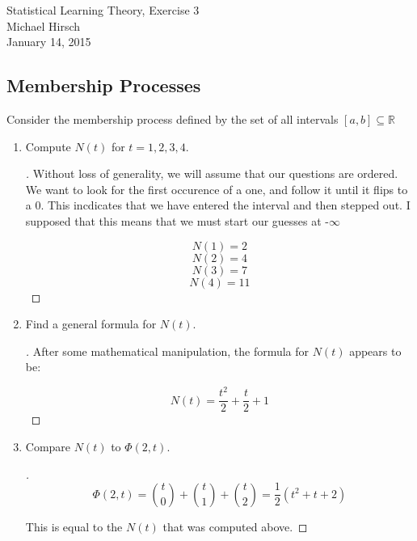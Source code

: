 \documentclass[]{book}
\theoremstyle{definition}
\begin{document}
\begin{center}
{\Large Statistical Learning Theory, Exercise 3}\\
Michael Hirsch\\ %
January 14, 2015 %
\end{center}

\vspace{0.2 cm}


\subsection*{Membership Processes}

Consider the membership process defined by the set of all intervals $[a, b] \subseteq \mathbb{R}$


\begin{enumerate}
\item\label{norms}

Compute $N(t)$ for $t = 1, 2, 3, 4$.

\begin{proof}[\unskip\nopunct]

Without loss of generality, we will assume that our questions are ordered. We want to look for the first occurence of a one, and follow it until it flips to a 0. This incdicates that we have entered the interval and then stepped out. I supposed that this means that we must start our guesses at -$\infty$

$$N(1) = 2$$
$$N(2) = 4$$
$$N(3) = 7$$
$$N(4) = 11$$



\end{proof}

\item

Find a general formula for $N(t)$.

\begin{proof}[\unskip\nopunct]

After some mathematical manipulation, the formula for $N(t)$ appears to be:

$$N(t) = \dfrac{t^{2}}{2} + \dfrac{t}{2} + 1 $$

\end{proof}

\item	

Compare $N(t)$ to $\Phi(2,t)$.

\begin{proof}[\unskip\nopunct]
		
$$\Phi(2,t) = {t \choose 0} + {t \choose 1} + {t \choose 2} = \dfrac{1}{2}(t^{2}+t+2) $$

This is equal to the $N(t)$ that was computed above.

\end{proof}

\end{enumerate}
\end{document}

